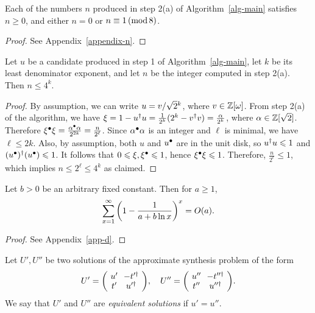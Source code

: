 \documentclass{article}
\begin{document}
\begin{lemma}\label{lem-n}
  Each of the numbers $n$ produced in step 2(a) of
  Algorithm~\ref{alg-main} satisfies $n\geq 0$, and either $n=0$ or
  $n\equiv1\,(\mathop{{\rm mod}}8)$.
\end{lemma}

\begin{proof}
  See Appendix~\ref{appendix-n}.
\end{proof}

\begin{lemma}\label{lem-n2}
  Let $u$ be a candidate produced in step 1 of
  Algorithm~\ref{alg-main}, let $k$ be its least denominator exponent,
  and let $n$ be the integer computed in step 2(a).
  Then $n\leq 4^k$.
\end{lemma}

\begin{proof}
  By assumption, we can write $u={v}/{\sqrt{2}{}^{k}}$, where
  $v\in\mathbb{Z}[\omega]$.  From step 2(a) of the algorithm, we have $\xi =
  1-u^{\dagger} u = \frac{1}{2^k}(2^k-v^{\dagger} v) = \frac{\alpha}{2^k}$, where
  $\alpha\in\mathbb{Z}[\sqrt2]$. Therefore $\xi^{\bullet}\xi =
  \frac{\alpha^{\bullet}\alpha}{2^{2k}} = \frac{n}{2^\ell}$. Since
  $\alpha^{\bullet}\alpha$ is an integer and $\ell$ is minimal, we have
  $\ell\leq 2k$. Also, by assumption, both $u$ and $u^{\bullet}$ are in the
  unit disk, so $u^{\dagger} u\leqslant 1$ and $(u^{\bullet})^{\dagger}(u^{\bullet})\leqslant 1$. It
  follows that $0\leqslant \xi,\xi^{\bullet}\leqslant 1$, hence $\xi^{\bullet}\xi\leqslant 1$.
  Therefore, $\frac{n}{2^\ell}\leq 1$, which implies $n\leq 2^\ell
  \leq 4^k$ as claimed.
\end{proof}

\begin{lemma}\label{lem-summation}
  Let $b>0$ be an arbitrary fixed constant. Then for $a\geq 1$,
  \[ \sum_{x=1}^{\infty} \left(1-\frac{1}{a+b\ln x}\right)^x = O(a).
  \]
\end{lemma}

\begin{proof}
  See Appendix~\ref{app-d}.
\end{proof}

\begin{definition}
  Let $U',U''$ be two solutions of the approximate synthesis problem 
  of the form
  \begin{equation}\label{eqn-u1-u2}
    U' = \zmatrix{cc}{u' & -t'^{\dagger} \\ t' & u'^{\dagger}},
    \quad
    U'' = \zmatrix{cc}{u'' & -t''^{\dagger} \\ t'' & u''^{\dagger}}.
  \end{equation}
  We say that $U'$ and $U''$ are {\em equivalent solutions} if
  $u'=u''$.
\end{definition}
\end{document}
